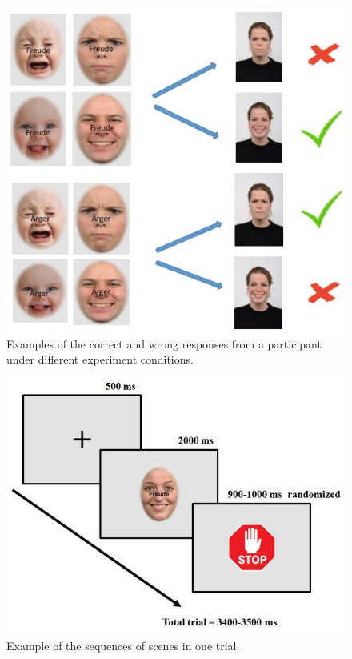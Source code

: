 
\begin{figure}[!t]
\centering
  \includegraphics[width=0.9\linewidth]{pictures/Extended_Stroop_Task.png}
  \caption{Examples of the correct and wrong responses from a participant under different experiment conditions.
}
  \label{fig.method.task}
\end{figure}


\begin{figure}[!t]
  \includegraphics[width=0.9\linewidth]{pictures/One_Trial.png}
  \caption{Example of the sequences of scenes in one trial.
}
  \label{fig.method.sequence}
\end{figure}

